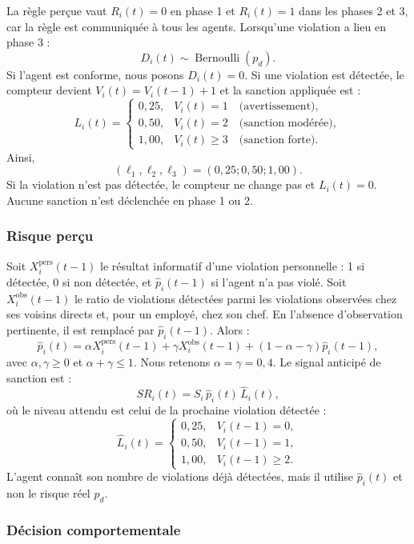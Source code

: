 \documentclass[11pt,a4paper]{article}
\begin{document}
La règle perçue vaut $R_i(t)=0$ en phase 1 et $R_i(t)=1$ dans les phases 2 et
3, car la règle est communiquée à tous les agents. Lorsqu’une violation a lieu
en phase 3 :
\[
D_i(t)\sim\operatorname{Bernoulli}(p_d).
\]
Si l’agent est conforme, nous posons $D_i(t)=0$. Si une violation est détectée,
le compteur devient $V_i(t)=V_i(t-1)+1$ et la sanction appliquée est :
\[
L_i(t)=
\begin{cases}
0{,}25,&V_i(t)=1 \quad\text{(avertissement)},\\
0{,}50,&V_i(t)=2 \quad\text{(sanction modérée)},\\
1{,}00,&V_i(t)\geq3 \quad\text{(sanction forte)}.
\end{cases}
\]
Ainsi,
\[
(\ell_1,\ell_2,\ell_3)=(0{,}25;0{,}50;1{,}00).
\]
Si la violation n’est pas détectée, le compteur ne change pas et $L_i(t)=0$.
Aucune sanction n’est déclenchée en phase 1 ou 2.

\subsubsection{Risque perçu}

Soit $X_i^{\mathrm{pers}}(t-1)$ le résultat informatif d’une violation
personnelle : 1 si détectée, 0 si non détectée, et $\widehat p_i(t-1)$ si
l’agent n’a pas violé. Soit $X_i^{\mathrm{obs}}(t-1)$ le ratio de violations
détectées parmi les violations observées chez ses voisins directs et, pour un
employé, chez son chef. En l’absence d’observation pertinente, il est remplacé
par $\widehat p_i(t-1)$. Alors :
\[
\widehat p_i(t)=
\alpha X_i^{\mathrm{pers}}(t-1)
+\gamma X_i^{\mathrm{obs}}(t-1)
+(1-\alpha-\gamma)\widehat p_i(t-1),
\]
avec $\alpha,\gamma\geq0$ et $\alpha+\gamma\leq1$. Nous retenons
$\alpha=\gamma=0{,}4$. Le signal anticipé de sanction est :
\[
SR_i(t)=S_i\,\widehat p_i(t)\,\widehat L_i(t),
\]
où le niveau attendu est celui de la prochaine violation détectée :
\[
\widehat L_i(t)=
\begin{cases}
0{,}25,&V_i(t-1)=0,\\
0{,}50,&V_i(t-1)=1,\\
1{,}00,&V_i(t-1)\geq2.
\end{cases}
\]
L’agent connaît son nombre de violations déjà détectées, mais il utilise
$\widehat p_i(t)$ et non le risque réel $p_d$.

\subsubsection{Décision comportementale}
\end{document}
